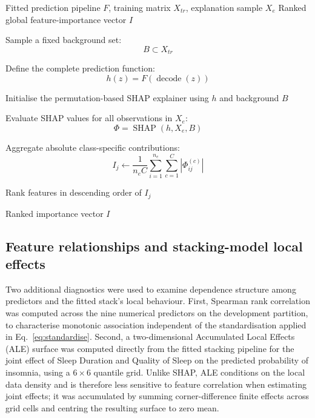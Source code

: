 \documentclass{elektr}
\begin{document}
\begin{algorithm}[H]
\caption{Permutation-SHAP Procedure for Global Model Auditing}
\label{alg:shap}
\small
\begin{algorithmic}[1]

\Require Fitted prediction pipeline $F$, training matrix $X_{tr}$,
explanation sample $X_e$
\Ensure Ranked global feature-importance vector $I$

\State Sample a fixed background set:
\[
B\subset X_{tr}
\]

\State Define the complete prediction function:
\[
h(z)=F(\operatorname{decode}(z))
\]

\State Initialise the permutation-based SHAP explainer
using $h$ and background $B$

\State Evaluate SHAP values for all observations in $X_e$:
\[
\Phi=\operatorname{SHAP}(h,X_e,B)
\]


    \State Aggregate absolute class-specific contributions:
    \[
    I_j\gets
    \frac{1}{n_eC}
    \sum_{i=1}^{n_e}
    \sum_{c=1}^{C}
    \left|\Phi_{ij}^{(c)}\right|
    \]

\EndFor

\State Rank features in descending order of $I_j$

\State \Return Ranked importance vector $I$

\end{algorithmic}
\end{algorithm}

\subsection{Feature relationships and stacking-model local effects}
\label{sec:ale}
Two additional diagnostics were used to examine dependence structure among predictors and the fitted stack's local behaviour. First, Spearman rank correlation was computed across the nine numerical predictors on the development partition, to characterise monotonic association independent of the standardisation applied in Eq.~\eqref{eq:standardise}. Second, a two-dimensional Accumulated Local Effects (ALE) surface was computed directly from the fitted stacking pipeline for the joint effect of Sleep Duration and Quality of Sleep on the predicted probability of insomnia, using a $6\times6$ quantile grid. Unlike SHAP, ALE conditions on the local data density and is therefore less sensitive to feature correlation when estimating joint effects; it was accumulated by summing corner-difference finite effects across grid cells and centring the resulting surface to zero mean.
\end{document}
